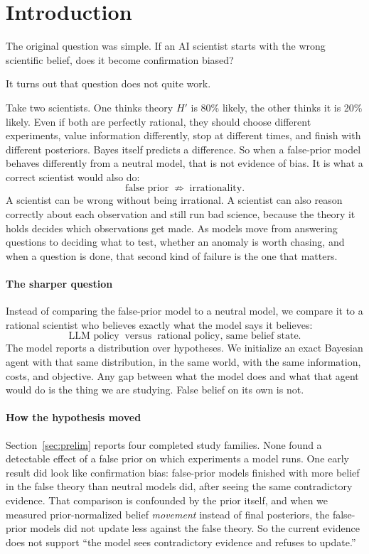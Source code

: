 \documentclass[10pt,letterpaper,twocolumn]{article}
\begin{document}
\section{Introduction}
\label{sec:intro}

The original question was simple. If an AI scientist starts with the wrong scientific belief, does it become confirmation biased?

It turns out that question does not quite work.

Take two scientists. One thinks theory $H'$ is 80\% likely, the other thinks it is 20\% likely. Even if both are perfectly rational, they should choose different experiments, value information differently, stop at different times, and finish with different posteriors. Bayes itself predicts a difference. So when a false-prior model behaves differently from a neutral model, that is not evidence of bias. It is what a correct scientist would also do:
\[
\text{false prior} \;\not\Rightarrow\; \text{irrationality}.
\]
A scientist can be wrong without being irrational. A scientist can also reason correctly about each observation and still run bad science, because the theory it holds decides which observations get made. As models move from answering questions to deciding what to test, whether an anomaly is worth chasing, and when a question is done, that second kind of failure is the one that matters.

\paragraph{The sharper question}
Instead of comparing the false-prior model to a neutral model, we compare it to a rational scientist who believes exactly what the model says it believes:
\[
\text{LLM policy} \;\;\text{versus}\;\; \text{rational policy, same belief state}.
\]
The model reports a distribution over hypotheses. We initialize an exact Bayesian agent with that same distribution, in the same world, with the same information, costs, and objective. Any gap between what the model does and what that agent would do is the thing we are studying. False belief on its own is not.

\paragraph{How the hypothesis moved}
Section~\ref{sec:prelim} reports four completed study families. None found a detectable effect of a false prior on which experiments a model runs. One early result did look like confirmation bias: false-prior models finished with more belief in the false theory than neutral models did, after seeing the same contradictory evidence. That comparison is confounded by the prior itself, and when we measured prior-normalized belief \emph{movement} instead of final posteriors, the false-prior models did not update less against the false theory. So the current evidence does not support ``the model sees contradictory evidence and refuses to update.''
\end{document}
